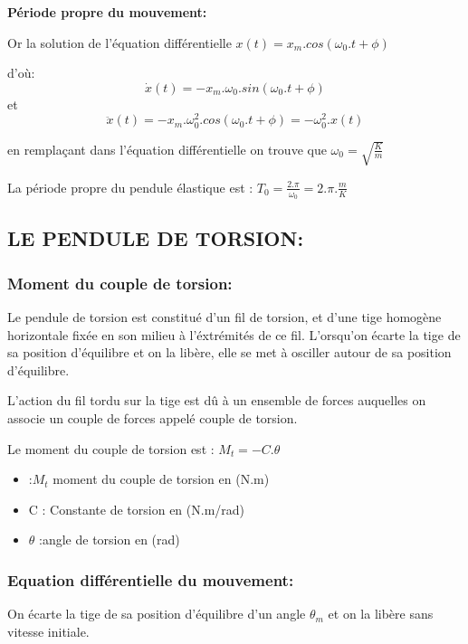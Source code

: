 \documentclass[12pt]{article}
\begin{document}
\textbf{Période propre du mouvement: }

Or la solution de l'équation différentielle $x(t) = x_m.cos(\omega_0.t + \phi)$ 

d’où: $$\dot{x}(t) = -x_m.\omega_0.sin(\omega_0.t + \phi)$$ et $$\ddot{x}(t) = -x_m.\omega_0^2.cos(\omega_0.t + \phi) = -\omega_0^2 . x(t)$$

en remplaçant dans l'équation différentielle on trouve que $\omega_0 = \sqrt{\frac{K}{m}}$

La période propre du pendule élastique est : $T_0  = \frac{2.\pi}{\omega_0} = 2.\pi.\frac{m}{K}$

\subsection{LE PENDULE DE TORSION:}

\subsubsection{Moment du couple de torsion:}
Le pendule de torsion est constitué d'un fil de torsion, et d'une tige homogène horizontale fixée en son milieu à l'éxtrémités de ce
fil. L'orsqu'on écarte la tige de sa position d'équilibre et on la libère, elle se met à osciller autour de sa position d'équilibre.


L'action du fil tordu sur la tige est dû à un ensemble de forces auquelles on associe un couple de forces appelé couple de torsion.

Le moment du couple de torsion est : $M_t = - C. \theta$

\begin{itemize}

	\item :$M_t$ moment du couple de torsion en (N.m)

	\item C  : Constante de torsion en (N.m/rad)

	\item $\theta $ :angle de torsion en (rad)
\end{itemize}

\subsubsection{Equation différentielle du mouvement: }

On écarte la tige de sa position d'équilibre d'un angle  $\theta_m$ et on la libère sans vitesse initiale.
\end{document}

